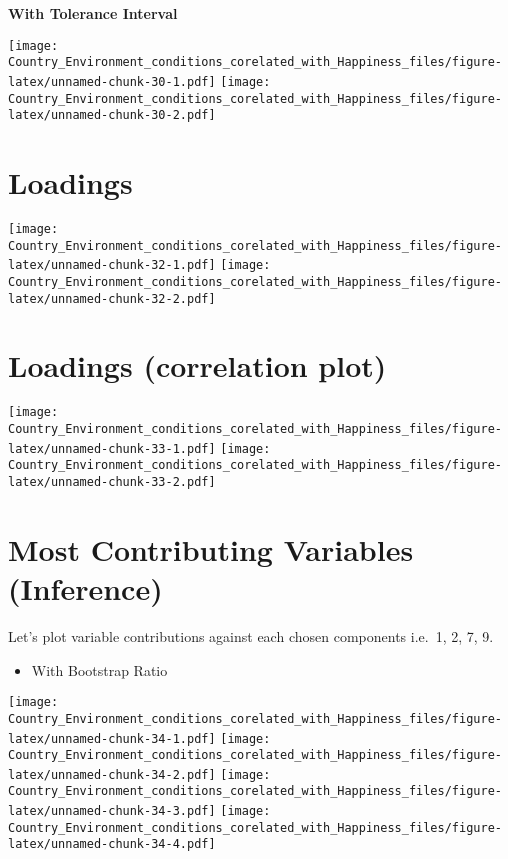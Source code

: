 \documentclass[]{book}
\providecommand{\tightlist}{%
  \setlength{\itemsep}{0pt}\setlength{\parskip}{0pt}}
\begin{document}
\textbf{With Tolerance Interval}

\texttt{[image: Country\_Environment\_conditions\_corelated\_with\_Happiness\_files/figure-latex/unnamed-chunk-30-1.pdf]}
\texttt{[image: Country\_Environment\_conditions\_corelated\_with\_Happiness\_files/figure-latex/unnamed-chunk-30-2.pdf]}

\hypertarget{loadings-1}{%
\section{Loadings}\label{loadings-1}}

\texttt{[image: Country\_Environment\_conditions\_corelated\_with\_Happiness\_files/figure-latex/unnamed-chunk-32-1.pdf]}
\texttt{[image: Country\_Environment\_conditions\_corelated\_with\_Happiness\_files/figure-latex/unnamed-chunk-32-2.pdf]}

\hypertarget{loadings-correlation-plot}{%
\section{Loadings (correlation plot)}\label{loadings-correlation-plot}}

\texttt{[image: Country\_Environment\_conditions\_corelated\_with\_Happiness\_files/figure-latex/unnamed-chunk-33-1.pdf]}
\texttt{[image: Country\_Environment\_conditions\_corelated\_with\_Happiness\_files/figure-latex/unnamed-chunk-33-2.pdf]}

\hypertarget{most-contributing-variables-inference}{%
\section{Most Contributing Variables
(Inference)}\label{most-contributing-variables-inference}}

Let's plot variable contributions against each chosen components i.e.~1,
2, 7, 9.

\begin{itemize}
\tightlist
\item
  With Bootstrap Ratio
\end{itemize}

\texttt{[image: Country\_Environment\_conditions\_corelated\_with\_Happiness\_files/figure-latex/unnamed-chunk-34-1.pdf]}
\texttt{[image: Country\_Environment\_conditions\_corelated\_with\_Happiness\_files/figure-latex/unnamed-chunk-34-2.pdf]}
\texttt{[image: Country\_Environment\_conditions\_corelated\_with\_Happiness\_files/figure-latex/unnamed-chunk-34-3.pdf]}
\texttt{[image: Country\_Environment\_conditions\_corelated\_with\_Happiness\_files/figure-latex/unnamed-chunk-34-4.pdf]}
\end{document}
